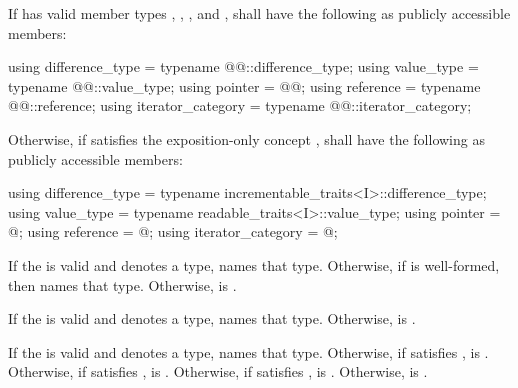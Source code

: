 \begin{itemize}
\item
If  has valid member
types , , 
, and ,
shall have the following as publicly accessible members:
\begin{codeblock}
  using difference_type   = typename @@::difference_type;
  using value_type        = typename @@::value_type;
  using pointer           = @\newtxt{\seebelownc}@;
  using reference         = typename @@::reference;
  using iterator_category = typename @@::iterator_category;
\end{codeblock}

{\color{newclr}
\item
Otherwise, if  satisfies the exposition-only concept
,  shall
have the following as publicly accessible members:
\begin{codeblock}
  using difference_type   = typename incrementable_traits<I>::difference_type;
  using value_type        = typename readable_traits<I>::value_type;
  using pointer           = @\seebelownc@;
  using reference         = @\seebelownc@;
  using iterator_category = @\seebelownc@;
\end{codeblock}
If the   is valid and denotes a type,
 names that type. Otherwise, if
 is well-formed, then
 names that type.  Otherwise,
 is .

If the   is valid and denotes a
type,  names that type. Otherwise,  is
.

If the   is valid and
denotes a type,  names that type. Otherwise, if
 satisfies ,
 is . Otherwise, if
 satisfies ,
 is . Otherwise, if
 satisfies ,
 is .
Otherwise,  is .

}
\end{itemize}
